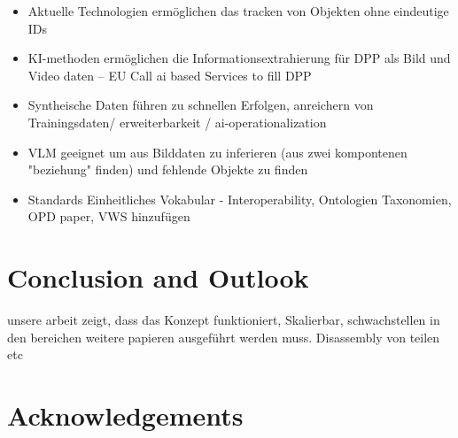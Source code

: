 \documentclass[3p,times,procedia]{elsarticle}
\begin{document}
\begin{itemize}
    \item Aktuelle Technologien ermöglichen das tracken von Objekten ohne eindeutige IDs
    \item KI-methoden ermöglichen die Informationsextrahierung für DPP als Bild und Video daten --\> EU Call  ai based Services to fill DPP
    \item Syntheische Daten führen zu schnellen Erfolgen, anreichern von Trainingsdaten/ erweiterbarkeit / ai-operationalization  
    \item VLM geeignet um aus Bilddaten zu inferieren (aus zwei kompontenen "beziehung" finden) und fehlende Objekte zu finden 
    \item Standards Einheitliches Vokabular - Interoperability, Ontologien Taxonomien, OPD paper, VWS hinzufügen
\end{itemize}



\section{Conclusion and Outlook}
unsere arbeit zeigt, dass das Konzept funktioniert, Skalierbar, schwachstellen in den bereichen weitere papieren ausgeführt werden muss. 
Disassembly von teilen etc 



\section{Acknowledgements}



\end{document}
